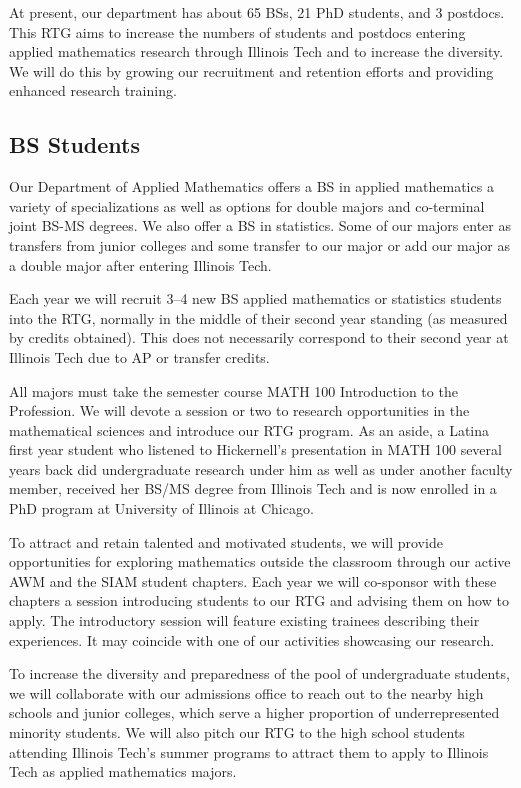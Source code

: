 \documentclass[11pt]{NSFamsart}
\newcommand{\numUG}{65\xspace}
\newcommand{\numPhD}{21\xspace}
\newcommand{\numPostDoc}{3\xspace}
\begin{document}
At present, our department has about \numUG BSs, \numPhD PhD students, and \numPostDoc postdocs.  This RTG aims to increase the numbers of students and postdocs entering applied mathematics research through Illinois Tech and to increase the diversity.  We will do this by growing our recruitment and retention efforts and providing enhanced research training.

\subsection*{BS Students}
Our Department of Applied Mathematics offers a BS in applied mathematics a variety of specializations as well as options for double majors and co-terminal joint BS-MS degrees. We also offer a BS in statistics.  Some of our majors enter as transfers from junior colleges and some transfer to our major or add our major as a double major after entering Illinois Tech.

Each year we will recruit 3--4 new BS applied mathematics or statistics students into the RTG, normally in the middle of their second year standing (as measured by credits obtained).  This does not necessarily correspond to their second year at Illinois Tech due to AP or transfer credits.

All majors must take the semester course MATH 100 Introduction to the Profession.  We will devote a session or two to research opportunities in the mathematical sciences and introduce our RTG program. As an aside, a Latina first year student who listened to Hickernell's presentation in MATH 100 several years back did undergraduate research under him as well as under another faculty member, received her BS/MS degree from Illinois Tech and is now enrolled in a PhD program at University of Illinois at Chicago.

To attract and retain talented and motivated students, we will provide opportunities for exploring mathematics outside the classroom through our active AWM and the SIAM student chapters.  Each year we will co-sponsor with these chapters a session introducing students to our RTG and advising them on how to apply.  The introductory session will feature existing trainees describing their experiences. It may coincide with one of our activities showcasing our research.

To increase the diversity and preparedness of the pool of undergraduate students, we will collaborate with our admissions office to reach out to the nearby high schools and junior colleges, which serve a higher proportion of underrepresented minority students.  We will also pitch our RTG to the high school students attending Illinois Tech's summer programs to attract them to apply to Illinois Tech as applied mathematics majors.
\end{document}
